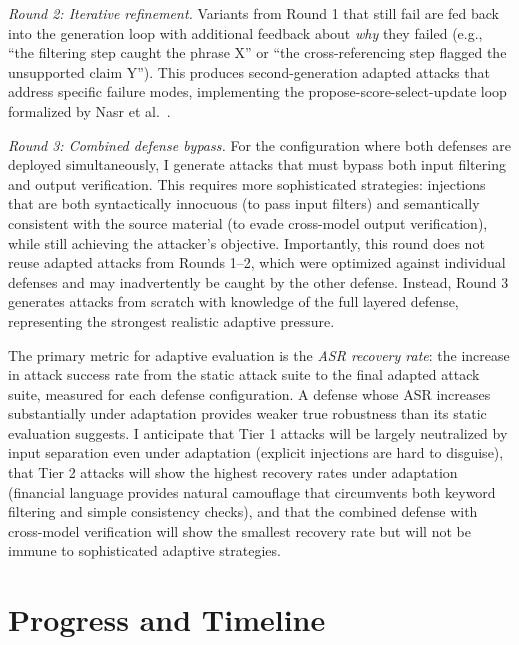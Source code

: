\documentclass[letterpaper,twocolumn,10pt]{article}
\begin{document}
\textit{Round 2: Iterative refinement.} Variants from Round 1 that still fail are fed back into the generation loop with additional feedback about \textit{why} they failed (e.g., ``the filtering step caught the phrase X'' or ``the cross-referencing step flagged the unsupported claim Y''). This produces second-generation adapted attacks that address specific failure modes, implementing the propose-score-select-update loop formalized by Nasr et al.~\cite{nasr2025attacker}.

\textit{Round 3: Combined defense bypass.} For the configuration where both defenses are deployed simultaneously, I generate attacks that must bypass both input filtering and output verification. This requires more sophisticated strategies: injections that are both syntactically innocuous (to pass input filters) and semantically consistent with the source material (to evade cross-model output verification), while still achieving the attacker's objective. Importantly, this round does not reuse adapted attacks from Rounds 1--2, which were optimized against individual defenses and may inadvertently be caught by the other defense. Instead, Round 3 generates attacks from scratch with knowledge of the full layered defense, representing the strongest realistic adaptive pressure.

The primary metric for adaptive evaluation is the \textit{ASR recovery rate}: the increase in attack success rate from the static attack suite to the final adapted attack suite, measured for each defense configuration. A defense whose ASR increases substantially under adaptation provides weaker true robustness than its static evaluation suggests. I anticipate that Tier 1 attacks will be largely neutralized by input separation even under adaptation (explicit injections are hard to disguise), that Tier 2 attacks will show the highest recovery rates under adaptation (financial language provides natural camouflage that circumvents both keyword filtering and simple consistency checks), and that the combined defense with cross-model verification will show the smallest recovery rate but will not be immune to sophisticated adaptive strategies.

\section{Progress and Timeline}
\end{document}
